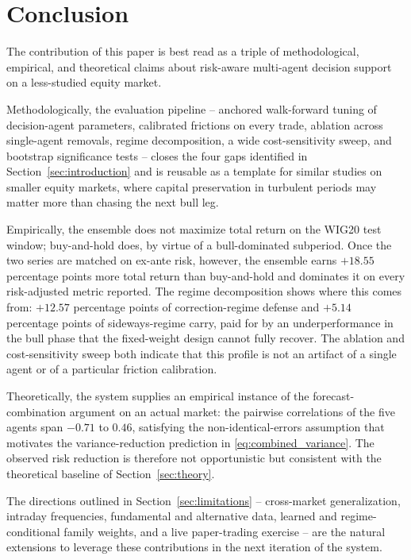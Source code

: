 \documentclass{ieeeaccess}
\newcommand{\VolScaledExcessPP}{\ensuremath{+18.55}}
\newcommand{\CorrectionDefencePP}{\ensuremath{+12.57}}
\newcommand{\SidewaysExcessPP}{\ensuremath{+5.14}}
\newcommand{\CorrMin}{\ensuremath{-0.71}}
\newcommand{\CorrMax}{\ensuremath{0.46}}
\begin{document}
\section{Conclusion}
\label{sec:conclusion}

The contribution of this paper is best read as a triple of methodological, empirical, and theoretical claims about risk-aware multi-agent decision support on a less-studied equity market.

Methodologically, the evaluation pipeline -- anchored walk-forward tuning of decision-agent parameters, calibrated frictions on every trade, ablation across single-agent removals, regime decomposition, a wide cost-sensitivity sweep, and bootstrap significance tests -- closes the four gaps identified in Section~\ref{sec:introduction} and is reusable as a template for similar studies on smaller equity markets, where capital preservation in turbulent periods may matter more than chasing the next bull leg.

Empirically, the ensemble does not maximize total return on the WIG20 test window; buy-and-hold does, by virtue of a bull-dominated subperiod. Once the two series are matched on ex-ante risk, however, the ensemble earns $\VolScaledExcessPP$ percentage points more total return than buy-and-hold and dominates it on every risk-adjusted metric reported. The regime decomposition shows where this comes from: $\CorrectionDefencePP$ percentage points of correction-regime defense and $\SidewaysExcessPP$ percentage points of sideways-regime carry, paid for by an underperformance in the bull phase that the fixed-weight design cannot fully recover. The ablation and cost-sensitivity sweep both indicate that this profile is not an artifact of a single agent or of a particular friction calibration.

Theoretically, the system supplies an empirical instance of the forecast-combination argument on an actual market: the pairwise correlations of the five agents span $\CorrMin$ to $\CorrMax$, satisfying the non-identical-errors assumption that motivates the variance-reduction prediction in \eqref{eq:combined_variance}. The observed risk reduction is therefore not opportunistic but consistent with the theoretical baseline of Section~\ref{sec:theory}.

The directions outlined in Section~\ref{sec:limitations} -- cross-market generalization, intraday frequencies, fundamental and alternative data, learned and regime-conditional family weights, and a live paper-trading exercise -- are the natural extensions to leverage these contributions in the next iteration of the system.




\EOD
\end{document}
